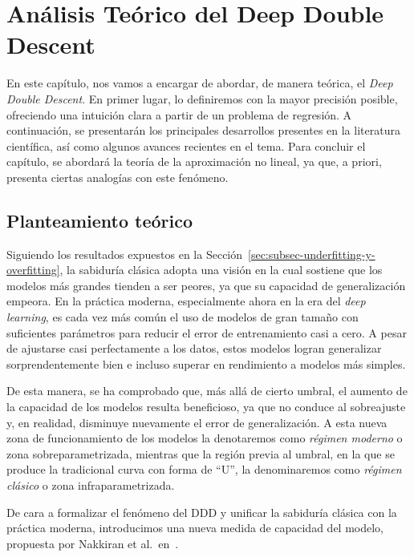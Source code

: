 
\chapter{Análisis Teórico del Deep Double Descent}\label{ch:analisis-teorico-ddd}

En este capítulo, nos vamos a encargar de abordar, de manera teórica, el \textit{Deep Double Descent}. En primer lugar, lo definiremos con la mayor precisión posible, ofreciendo una intuición clara a partir de un problema de regresión. A continuación, se presentarán los principales desarrollos presentes en la literatura científica, así como algunos avances recientes en el tema. Para concluir el capítulo, se abordará la teoría de la aproximación no lineal, ya que, a priori, presenta ciertas analogías con este fenómeno.

\section{Planteamiento teórico}\label{sec:planteamiento-teorico}

Siguiendo los resultados expuestos en la Sección~\ref{sec:subsec-underfitting-y-overfitting}, la sabiduría clásica adopta una visión en la cual sostiene que los modelos más grandes tienden a ser peores, ya que su capacidad de generalización empeora. En la práctica moderna, especialmente ahora en la era del \textit{deep learning}, es cada vez más común el uso de modelos de gran tamaño con suficientes parámetros para reducir el error de entrenamiento casi a cero. A pesar de ajustarse casi perfectamente a los datos, estos modelos logran generalizar sorprendentemente bien e incluso superar en rendimiento a modelos más simples.

De esta manera, se ha comprobado que, más allá de cierto umbral, el aumento de la capacidad de los modelos resulta beneficioso, ya que no conduce al sobreajuste y, en realidad, disminuye nuevamente el error de generalización. A esta nueva zona de funcionamiento de los modelos la denotaremos como \emph{régimen moderno} o zona sobreparametrizada, mientras que la región previa al umbral, en la que se produce la tradicional curva con forma de ``U'', la denominaremos como \textit{régimen clásico} o zona infraparametrizada.

De cara a formalizar el fenómeno del DDD y unificar la sabiduría clásica con la práctica moderna, introducimos una nueva medida de capacidad del modelo, propuesta por Nakkiran et al.\ en~\cite{Nakkiran2019}.

